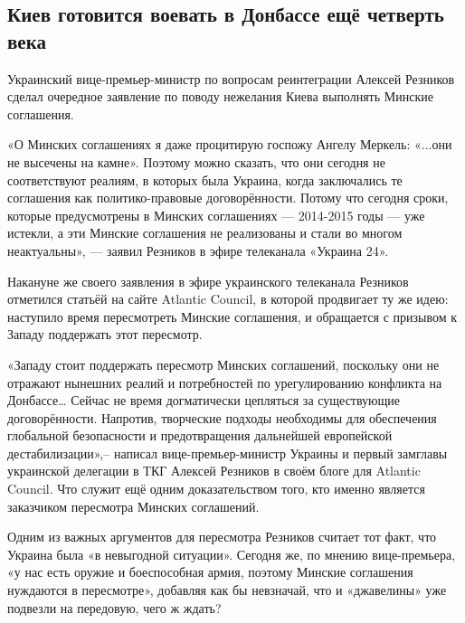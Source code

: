  
 

\subsection{Киев готовится воевать в Донбассе ещё четверть века}
\label{sec:13_07_2020.fb.lnr.2}
  
Украинский вице-премьер-министр по вопросам реинтеграции Алексей Резников
сделал очередное заявление по поводу нежелания Киева выполнять Минские
соглашения.

«О Минских соглашениях я даже процитирую госпожу Ангелу Меркель: «...они не
высечены на камне». Поэтому можно сказать, что они сегодня не соответствуют
реалиям, в которых была Украина, когда заключались те соглашения как
политико-правовые договорённости. Потому что сегодня сроки, которые
предусмотрены в Минских соглашениях --- 2014-2015 годы --- уже истекли, а эти
Минские соглашения не реализованы и стали во многом неактуальны», --- заявил
Резников в эфире телеканала «Украина 24».

Накануне же своего заявления в эфире украинского телеканала Резников отметился
статьёй на сайте Atlantic Council, в которой продвигает ту же идею: наступило
время пересмотреть Минские соглашения, и обращается с призывом к Западу
поддержать этот пересмотр.

«Западу стоит поддержать пересмотр Минских соглашений, поскольку они не
отражают нынешних реалий и потребностей по урегулированию конфликта на
Донбассе… Сейчас не время догматически цепляться за существующие
договорённости. Напротив, творческие подходы необходимы для обеспечения
глобальной безопасности и предотвращения дальнейшей европейской
дестабилизации»,– написал вице-премьер-министр Украины и первый замглавы
украинской делегации в ТКГ Алексей Резников в своём блоге для Atlantic Council.
Что служит ещё одним доказательством того, кто именно является заказчиком
пересмотра Минских соглашений.

Одним из важных аргументов для пересмотра Резников считает тот факт, что
Украина была «в невыгодной ситуации». Сегодня же, по мнению вице-премьера, «у
нас есть оружие и боеспособная армия, поэтому Минские соглашения нуждаются в
пересмотре», добавляя как бы невзначай, что и «джавелины» уже подвезли на
передовую, чего ж ждать?

